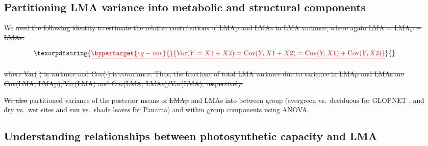 \documentclass[
  12pt,
  a4paper,
,tablecaptionabove
]{scrartcl}
\providecommand{\DIFaddtex}[1]{{\protect\color{blue}\uwave{#1}}} %
\providecommand{\DIFdeltex}[1]{{\protect\color{red}\sout{#1}}}                      %
\providecommand{\DIFaddbegin}{} %
\providecommand{\DIFaddend}{} %
\providecommand{\DIFdelbegin}{} %
\providecommand{\DIFdelend}{} %
\providecommand{\DIFadd}[1]{\texorpdfstring{\DIFaddtex{#1}}{#1}} %
\providecommand{\DIFdel}[1]{\texorpdfstring{\DIFdeltex{#1}}{}} %
\newcommand{\DIFscaledelfig}{0.5}
\newlength{\DIFdelgraphicswidth} %
\newlength{\DIFdelgraphicsheight} %
\newcommand{\DIFaddincludegraphics}[2][]{{\color{blue}\fbox{\DIFOincludegraphics[#1]{#2}}}} %
\newcommand{\DIFdelincludegraphics}[2][]{%
\sbox{\DIFdelgraphicsbox}{\DIFOincludegraphics[#1]{#2}}%
\settoboxwidth{\DIFdelgraphicswidth}{\DIFdelgraphicsbox} %
\settoboxtotalheight{\DIFdelgraphicsheight}{\DIFdelgraphicsbox} %
\scalebox{\DIFscaledelfig}{%
\parbox[b]{\DIFdelgraphicswidth}{\usebox{\DIFdelgraphicsbox}\\[-\baselineskip] \rule{\DIFdelgraphicswidth}{0em}}\llap{\resizebox{\DIFdelgraphicswidth}{\DIFdelgraphicsheight}{%
\setlength{\unitlength}{\DIFdelgraphicswidth}%
\begin{picture}(1,1)%
\thicklines\linethickness{2pt} %
{\color[rgb]{1,0,0}\put(0,0){\framebox(1,1){}}}%
{\color[rgb]{1,0,0}\put(0,0){\line( 1,1){1}}}%
{\color[rgb]{1,0,0}\put(0,1){\line(1,-1){1}}}%
\end{picture}%
}\hspace*{3pt}}} %
} %
\DeclareRobustCommand{\DIFaddbegin}{\DIFOaddbegin \let\includegraphics\DIFaddincludegraphics} %
\DeclareRobustCommand{\DIFaddend}{\DIFOaddend \let\includegraphics\DIFOincludegraphics} %
\DeclareRobustCommand{\DIFdelbegin}{\DIFOdelbegin \let\includegraphics\DIFdelincludegraphics} %
\DeclareRobustCommand{\DIFdelend}{\DIFOaddend \let\includegraphics\DIFOincludegraphics} %
\begin{document}
\hypertarget{partitioning-lma-variance-into-metabolic-and-structural-components}{%
\subsection{Partitioning LMA variance into metabolic and structural
components}\label{partitioning-lma-variance-into-metabolic-and-structural-components}}

We \DIFdelbegin \DIFdel{used the following identity to estimate the relative contributions of
LMAp and LMAs to LMA variance, where again LMA = LMAp + LMAs:
}%

\begin{displaymath}\DIFdel{\protect\hypertarget{eq-var}{}{
\mathrm{Var}(Y = X1 + X2) = \mathrm{Cov}(Y, X1+X2) = \mathrm{Cov}(Y,X1) + \mathrm{Cov}(Y,X2)
}%
}\end{displaymath}%

\DIFdel{where Var(\(\cdot\)) is variance and Cov(\(\cdot\)) is covariance. Thus,
the fractions of total LMA variance due to variance in LMAp and LMAs are
Cov(LMA, LMAp)/Var(LMA) and Cov(LMA, LMAs)/Var(LMA), respectively.
}%

\DIFdel{We also }\DIFdelend partitioned variance of the posterior means of \DIFdelbegin \DIFdel{LMAp }\DIFdelend \DIFaddbegin \DIFadd{LMAm }\DIFaddend and LMAs into
between group (evergreen vs.~deciduous for GLOPNET \DIFaddbegin \DIFadd{and Panama}\DIFaddend , and dry
vs.~wet sites and sun vs.~shade leaves for Panama) and within group
components using ANOVA.

\hypertarget{understanding-relationships-between-photosynthetic-capacity-and-lma}{%
\subsection{Understanding relationships between photosynthetic capacity
and
LMA}\label{understanding-relationships-between-photosynthetic-capacity-and-lma}}
\end{document}
